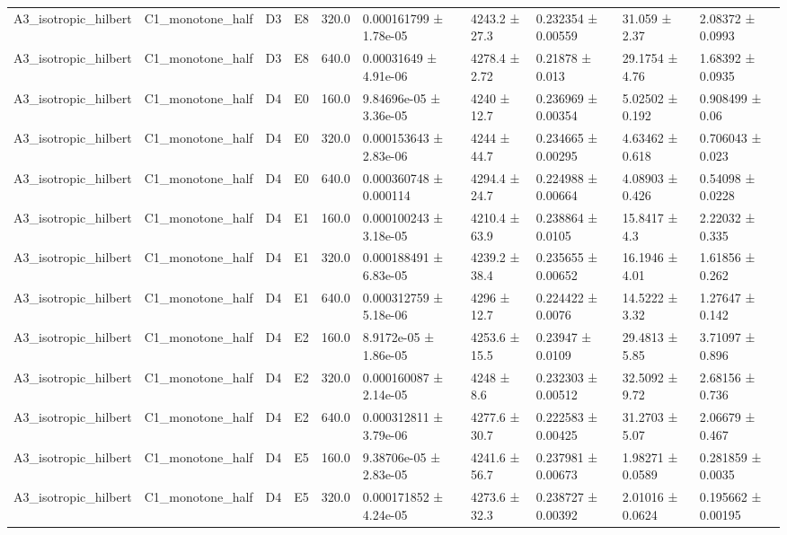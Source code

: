 \begin{table}
\begin{tabular}{llllllllll}
A3\_isotropic\_hilbert & C1\_monotone\_half & D3 & E8 & 320.0 & 0.000161799 ± 1.78e-05 & 4243.2 ± 27.3 & 0.232354 ± 0.00559 & 31.059 ± 2.37 & 2.08372 ± 0.0993 \\
A3\_isotropic\_hilbert & C1\_monotone\_half & D3 & E8 & 640.0 & 0.00031649 ± 4.91e-06 & 4278.4 ± 2.72 & 0.21878 ± 0.013 & 29.1754 ± 4.76 & 1.68392 ± 0.0935 \\
A3\_isotropic\_hilbert & C1\_monotone\_half & D4 & E0 & 160.0 & 9.84696e-05 ± 3.36e-05 & 4240 ± 12.7 & 0.236969 ± 0.00354 & 5.02502 ± 0.192 & 0.908499 ± 0.06 \\
A3\_isotropic\_hilbert & C1\_monotone\_half & D4 & E0 & 320.0 & 0.000153643 ± 2.83e-06 & 4244 ± 44.7 & 0.234665 ± 0.00295 & 4.63462 ± 0.618 & 0.706043 ± 0.023 \\
A3\_isotropic\_hilbert & C1\_monotone\_half & D4 & E0 & 640.0 & 0.000360748 ± 0.000114 & 4294.4 ± 24.7 & 0.224988 ± 0.00664 & 4.08903 ± 0.426 & 0.54098 ± 0.0228 \\
A3\_isotropic\_hilbert & C1\_monotone\_half & D4 & E1 & 160.0 & 0.000100243 ± 3.18e-05 & 4210.4 ± 63.9 & 0.238864 ± 0.0105 & 15.8417 ± 4.3 & 2.22032 ± 0.335 \\
A3\_isotropic\_hilbert & C1\_monotone\_half & D4 & E1 & 320.0 & 0.000188491 ± 6.83e-05 & 4239.2 ± 38.4 & 0.235655 ± 0.00652 & 16.1946 ± 4.01 & 1.61856 ± 0.262 \\
A3\_isotropic\_hilbert & C1\_monotone\_half & D4 & E1 & 640.0 & 0.000312759 ± 5.18e-06 & 4296 ± 12.7 & 0.224422 ± 0.0076 & 14.5222 ± 3.32 & 1.27647 ± 0.142 \\
A3\_isotropic\_hilbert & C1\_monotone\_half & D4 & E2 & 160.0 & 8.9172e-05 ± 1.86e-05 & 4253.6 ± 15.5 & 0.23947 ± 0.0109 & 29.4813 ± 5.85 & 3.71097 ± 0.896 \\
A3\_isotropic\_hilbert & C1\_monotone\_half & D4 & E2 & 320.0 & 0.000160087 ± 2.14e-05 & 4248 ± 8.6 & 0.232303 ± 0.00512 & 32.5092 ± 9.72 & 2.68156 ± 0.736 \\
A3\_isotropic\_hilbert & C1\_monotone\_half & D4 & E2 & 640.0 & 0.000312811 ± 3.79e-06 & 4277.6 ± 30.7 & 0.222583 ± 0.00425 & 31.2703 ± 5.07 & 2.06679 ± 0.467 \\
A3\_isotropic\_hilbert & C1\_monotone\_half & D4 & E5 & 160.0 & 9.38706e-05 ± 2.83e-05 & 4241.6 ± 56.7 & 0.237981 ± 0.00673 & 1.98271 ± 0.0589 & 0.281859 ± 0.0035 \\
A3\_isotropic\_hilbert & C1\_monotone\_half & D4 & E5 & 320.0 & 0.000171852 ± 4.24e-05 & 4273.6 ± 32.3 & 0.238727 ± 0.00392 & 2.01016 ± 0.0624 & 0.195662 ± 0.00195 \\

\end{tabular}
\end{table}
